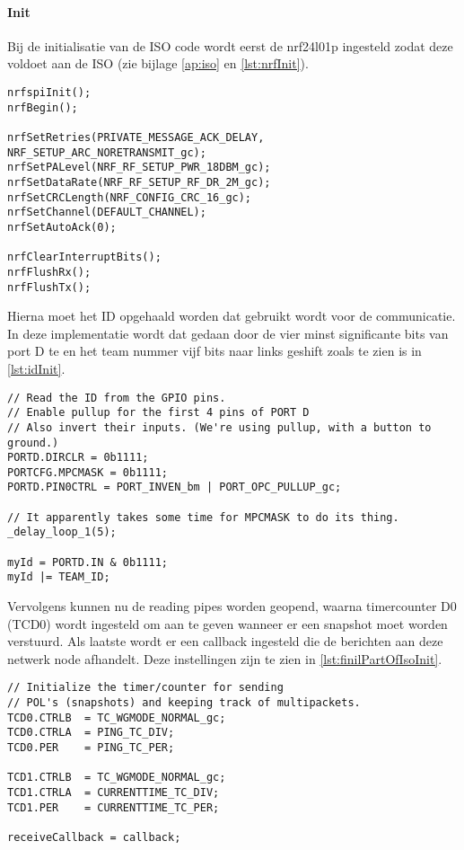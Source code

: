     \paragraph{Init}
        Bij de initialisatie van de ISO code wordt eerst de nrf24l01p ingesteld zodat deze voldoet aan de ISO (zie bijlage \ref{ap:iso} en \autoref{lst:nrfInit}). 
\begin{lstlisting}[caption={nrf init},captionpos=b,label={lst:nrfInit},style=c]
nrfspiInit();
nrfBegin();

nrfSetRetries(PRIVATE_MESSAGE_ACK_DELAY, NRF_SETUP_ARC_NORETRANSMIT_gc);
nrfSetPALevel(NRF_RF_SETUP_PWR_18DBM_gc);
nrfSetDataRate(NRF_RF_SETUP_RF_DR_2M_gc);
nrfSetCRCLength(NRF_CONFIG_CRC_16_gc);
nrfSetChannel(DEFAULT_CHANNEL);
nrfSetAutoAck(0);

nrfClearInterruptBits();
nrfFlushRx();
nrfFlushTx();
\end{lstlisting}
        Hierna moet het ID opgehaald worden dat gebruikt wordt voor de communicatie. In deze implementatie wordt dat gedaan door de vier minst significante bits van port D te en het team nummer vijf bits naar links geshift zoals te zien is in \autoref{lst:idInit}.
\begin{lstlisting}[caption={ID init},captionpos=b,label={lst:idInit},style=c]
// Read the ID from the GPIO pins.
// Enable pullup for the first 4 pins of PORT D
// Also invert their inputs. (We're using pullup, with a button to ground.)
PORTD.DIRCLR = 0b1111;
PORTCFG.MPCMASK = 0b1111; 
PORTD.PIN0CTRL = PORT_INVEN_bm | PORT_OPC_PULLUP_gc;

// It apparently takes some time for MPCMASK to do its thing.
_delay_loop_1(5);

myId = PORTD.IN & 0b1111;
myId |= TEAM_ID;
\end{lstlisting}
        Vervolgens kunnen nu de reading pipes worden geopend, waarna timercounter D0 (TCD0) wordt ingesteld om aan te geven wanneer er een snapshot moet worden verstuurd. Als laatste wordt er een callback ingesteld die de berichten aan deze netwerk node afhandelt. Deze instellingen zijn te zien in \autoref{lst:finilPartOfIsoInit}.
\begin{lstlisting}[caption={Laatste instellingen},captionpos=b,label={lst:finilPartOfIsoInit},style=c]
// Initialize the timer/counter for sending
// POL's (snapshots) and keeping track of multipackets.
TCD0.CTRLB  = TC_WGMODE_NORMAL_gc;
TCD0.CTRLA  = PING_TC_DIV;
TCD0.PER    = PING_TC_PER;

TCD1.CTRLB  = TC_WGMODE_NORMAL_gc;
TCD1.CTRLA  = CURRENTTIME_TC_DIV;
TCD1.PER    = CURRENTTIME_TC_PER;

receiveCallback = callback;
\end{lstlisting}

